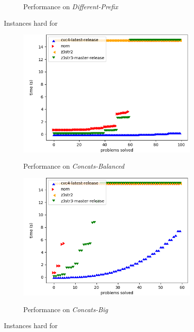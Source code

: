 \begin{figure}[h]
\begin{subfigure}{.5\textwidth}
        \caption{Performance on \textit{Different-Prefix}}
        \label{fig:different-prefix}
    \end{subfigure}
    \caption{Instances hard for \cvc{}}
    \label{fig:cvc-hard}
    \bigskip
    \begin{subfigure}{.5\textwidth}
        \includegraphics[width=\textwidth]{data/graphs/concats-balanced.png}
        \label{fig:concats-balanced}
        \caption{Performance on \textit{Concats-Balanced}}
    \end{subfigure}
    \begin{subfigure}{.5\textwidth}
        \includegraphics[width=\textwidth]{data/graphs/concats-big.png}
        \label{fig:concats-big}
        \caption{Performance on \textit{Concats-Big}}
    \end{subfigure}
    \caption{Instances hard for \us{}}
    \label{fig:z3str3-hard}
\end{figure}

